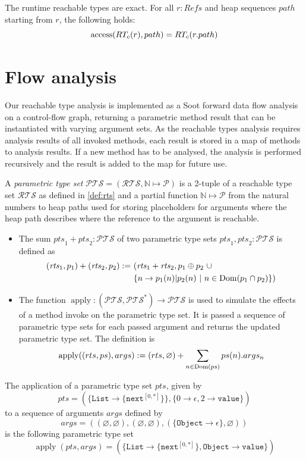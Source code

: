 \begin{remark}
The runtime reachable types are exact. For all $r : \mathit{Refs}$ and heap sequences $path$ starting from $r$, the following holds: \[ \operatorname{access}(RT_c(r),path) = RT_c(r.path) \]
\end{remark}


\section{Flow analysis}
Our reachable type analysis is implemented as a Soot forward data flow analysis on a control-flow graph, returning a parametric method result that can be instantiated with varying argument sets. As the reachable types analysis requires analysis results of all invoked methods, each result is stored in a map of methods to analysis results. If a new method has to be analysed, the analysis is performed recursively and the result is added to the map for future use.

\begin{definition}
\label{def:pts}
A \emph{parametric type set} $\mathcal{PTS} = (\mathcal{RTS}, \mathbb{N} \mapsto \mathcal{P})$ is a 2-tuple of a reachable type set $\mathcal{RTS}$ as defined in \cref{def:rts} and a partial function $\mathbb{N} \mapsto \mathcal{P}$ from the natural numbers to heap paths used for storing placeholders for arguments where the heap path describes where the reference to the argument is reachable.
\begin{itemize}
    \item The sum $\mathit{pts}_1 + \mathit{pts}_2 : \mathcal{PTS}$ of two parametric type sets $\mathit{pts}_1, \mathit{pts}_2 : \mathcal{PTS}$ is defined as 
    \begin{align*}
    (\mathit{rts}_1, p_1) + (\mathit{rts}_2, p_2) :=&\ (\mathit{rts}_1 + \mathit{rts}_2, p_1 \oplus p_2\ \cup \\
        &\ \{ n \to p_1(n) | p_2(n) \ |\ n \in \Dom(p_1 \cap p_2) \})
    \end{align*}
    \item The function $\operatorname{apply} : (\mathcal{PTS}, \mathcal{PTS}^*) \to \mathcal{PTS}$ is used to simulate the effects of a method invoke on the parametric type set. It is passed a sequence of parametric type sets for each passed argument and returns the updated parametric type set. The definition is 
    \[
    \operatorname{apply}((rts, ps), args) :=  (rts, \varnothing) + \sum_{n \in \operatorname{Dom}(ps)} ps(n).args_n
    \]
\end{itemize}
\end{definition}
\begin{example}
The application of a parametric type set $pts$, given by \[ pts = (\{\mathtt{List} \to \{\mathtt{next}^{[0,*]}\}\}, \{0 \to \epsilon, 2 \to \mathtt{value}\})\] to a sequence of arguments $\mathit{args}$ defined by \[\mathit{args} = ((\varnothing, \varnothing), (\varnothing, \varnothing), (\{ \texttt{Object} \to \epsilon \}, \varnothing))\] is the following parametric type set \[ \operatorname{apply}(pts, \mathit{args}) = (\{\mathtt{List} \to \{\mathtt{next}^{[0,*]}\}, \mathtt{Object} \to \mathtt{value}\}) \]
\end{example}

